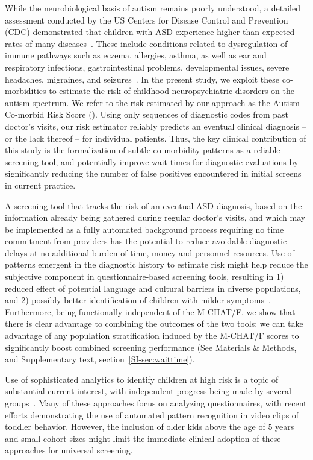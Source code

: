 \documentclass[onecolumn,10pt]{IEEEtran}
\begin{document}
While the neurobiological basis of autism remains poorly understood,  a detailed assessment conducted by the US Centers for Disease Control and Prevention (CDC) demonstrated that  children with ASD experience  higher than expected rates of many diseases~\cite{cdc}. These include conditions related to dysregulation of immune pathways such as eczema, allergies, asthma, as well as ear and respiratory infections, gastrointestinal problems, developmental issues, severe headaches, migraines, and seizures~\cite{pmid30733689,pmid22511918}. In the present study, we exploit   these   co-morbidities to estimate the risk of  childhood neuropsychiatric disorders on the autism spectrum. We refer to the risk estimated by our approach as the Autism Co-morbid Risk Score (\acor). Using only sequences of diagnostic codes from past doctor's visits, our risk estimator reliably
predicts an eventual clinical  diagnosis -- or the lack thereof -- for individual patients.
Thus, the key clinical  contribution of this study is the formalization  of subtle co-morbidity patterns as a reliable screening tool, and potentially  improve wait-times for diagnostic evaluations by significantly reducing the number of false positives encountered in initial screens in current practice.

 
A  screening  tool that tracks the risk of an eventual ASD diagnosis,  based  on the information already being gathered during regular doctor's visits, and which may be implemented as a  fully automated background process requiring no time commitment from providers has the potential to reduce avoidable diagnostic  delays at no additional burden of time, money and personnel resources.  Use of patterns emergent in  the diagnostic history to estimate risk might help reduce the subjective component in questionnaire-based screening tools, resulting in 1) reduced effect of potential language and cultural barriers in diverse populations, and 2) possibly better identification of  children with milder symptoms~\cite{hyman2020identification}.
Furthermore, being functionally independent of the M-CHAT/F, we show that there is clear advantage to combining the outcomes of the two tools: we can take advantage of any population stratification induced by the M-CHAT/F scores to significantly boost combined screening performance (See Materials \&  Methods, and Supplementary text, section~\ref{SI-sec:waittime}).
 


Use of sophisticated analytics to identify children at high risk is a topic of substantial current interest, with independent progress being made by several groups~\cite{hyde2019applications,abbas2020multi,duda2016clinical,duda2014testing,fusaro2014potential,wall2012use,wall2012use2}. Many of these approaches  focus on analyzing questionnaires, with recent efforts demonstrating the use of  automated pattern recognition in video clips of toddler behavior. However, the inclusion of older kids above the age of  $5$ years and  small cohort sizes might limit the immediate clinical adoption of these approaches for universal screening.
\end{document}
